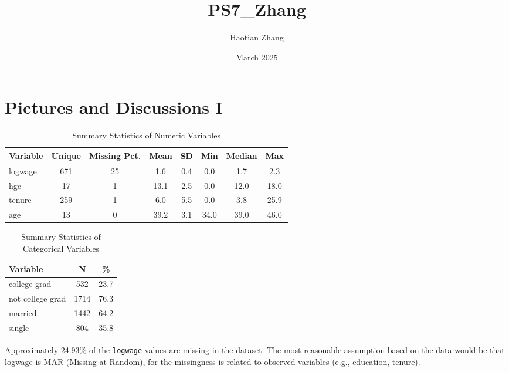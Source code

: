 \documentclass{article}
\title{PS7_Zhang}
\author{Haotian Zhang}
\date{March 2025}
\begin{document}
\maketitle

\section{Pictures and Discussions I}



\begin{table}[h]
\centering
\caption{Summary Statistics of Numeric Variables}
\begin{tabular}{l
                S[table-format=3]
                S[table-format=2]
                S[table-format=2.1]
                S[table-format=2.1]
                S[table-format=2.1]
                S[table-format=2.1]
                S[table-format=2.1]}
\toprule
\textbf{Variable} & \textbf{Unique} & \textbf{Missing Pct.} & \textbf{Mean} & \textbf{SD} & \textbf{Min} & \textbf{Median} & \textbf{Max} \\
\midrule
logwage & 671 & 25 & 1.6 & 0.4 & 0.0 & 1.7 & 2.3 \\
hgc     & 17  & 1  & 13.1 & 2.5 & 0.0 & 12.0 & 18.0 \\
tenure  & 259 & 1  & 6.0  & 5.5 & 0.0 & 3.8 & 25.9 \\
age     & 13  & 0  & 39.2 & 3.1 & 34.0 & 39.0 & 46.0 \\
\bottomrule
\end{tabular}
\end{table}

\vspace{1em}

\begin{table}[h]
\centering
\caption{Summary Statistics of Categorical Variables}
\begin{tabular}{l S[table-format=4] S[table-format=2.1]}
\toprule
\textbf{Variable} & \textbf{N} & \textbf{\%} \\
\midrule
college grad        & 532  & 23.7 \\
not college grad    & 1714 & 76.3 \\
\midrule
married             & 1442 & 64.2 \\
single              & 804  & 35.8 \\
\bottomrule
\end{tabular}
\end{table}
Approximately 24.93\% of the \texttt{logwage} values are missing in the dataset. The most reasonable assumption based on the data would be that logwage is MAR (Missing at Random), for the missingness is related to observed variables (e.g., education, tenure).
\end{document}
